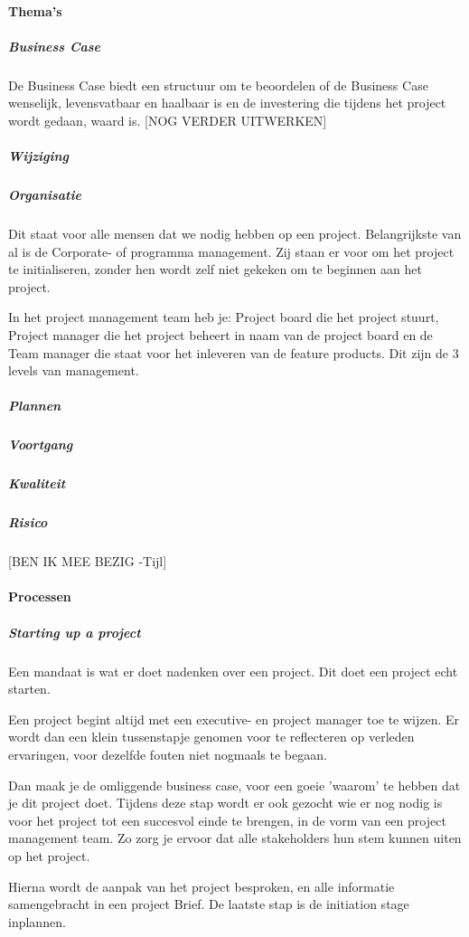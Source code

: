 \documentclass[]{article}
\begin{document}
\paragraph{Thema's}
\subparagraph{Business Case}
De Business Case biedt een structuur om te beoordelen of de Business Case wenselijk, levensvatbaar en haalbaar is en de investering die tijdens het project wordt gedaan, waard is. [NOG VERDER UITWERKEN]

\subparagraph{Wijziging}

\subparagraph{Organisatie}
Dit staat voor alle mensen dat we nodig hebben op een project. Belangrijkste van al is de Corporate- of programma management. Zij staan er voor om het project te initialiseren, zonder hen wordt zelf niet gekeken om te beginnen aan het project.

In het project management team heb je: Project board die het project stuurt, Project manager die het project beheert in naam van de project board en de Team manager die staat voor het inleveren van de feature products. Dit zijn de 3 levels van management.

\subparagraph{Plannen}

\subparagraph{Voortgang}

\subparagraph{Kwaliteit}

\subparagraph{Risico}
[BEN IK MEE BEZIG -Tijl]

\paragraph{Processen}

\subparagraph{Starting up a project}
Een mandaat is wat er doet nadenken over een project. Dit doet een project echt starten. 

Een project begint altijd met een executive- en project manager toe te wijzen. Er wordt dan een klein tussenstapje genomen voor te reflecteren op verleden ervaringen, voor dezelfde fouten niet nogmaals te begaan. 

Dan maak je de omliggende business case, voor een goeie 'waarom' te hebben dat je dit project doet. Tijdens deze stap wordt er ook gezocht wie er nog nodig is voor het project tot een succesvol einde te brengen, in de vorm van een project management team. Zo zorg je ervoor dat alle stakeholders hun stem kunnen uiten op het project. 

Hierna wordt de aanpak van het project besproken, en alle informatie samengebracht in een project Brief.
De laatste stap is de initiation stage inplannen.
\end{document}
